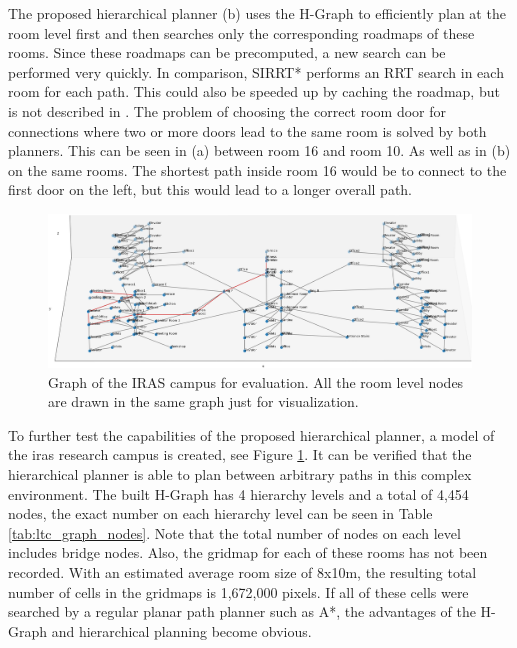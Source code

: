 The proposed hierarchical planner (b) uses the H-Graph to efficiently plan at the room level first and then searches only the corresponding roadmaps of these rooms. Since these roadmaps can be precomputed, a new search can be performed very quickly. In comparison, SIRRT* performs an RRT search in each room for each path. This could also be speeded up by caching the roadmap, but is not described in \cite{ryu_hierarchical_2020}. The problem of choosing the correct room door for connections where two or more doors lead to the same room is solved by both planners. This can be seen in (a) between room 16 and room 10. As well as in (b) on the same rooms. The shortest path inside room 16 would be to connect to the first door on the left, but this would lead to a longer overall path. 

\begin{figure}[h]
    \centering
    \includegraphics[width=\textwidth]{figures/40_concept/ltc_graph_complete.png}
    \caption[Graph of the IRAS campus for evaluation]{Graph of the IRAS campus for evaluation. All the room level nodes are drawn in the same graph just for visualization.}
    \label{fig:ltc_graph_complete}
\end{figure}

To further test the capabilities of the proposed hierarchical planner, a model of the \gls{iras} research campus is created, see Figure \ref{fig:ltc_graph_complete}. It can be verified that the hierarchical planner is able to plan between arbitrary paths in this complex environment. The built H-Graph has 4 hierarchy levels and a total of 4,454 nodes, the exact number on each hierarchy level can be seen in Table \ref{tab:ltc_graph_nodes}. Note that the total number of nodes on each level includes bridge nodes. Also, the gridmap for each of these rooms has not been recorded. With an estimated average room size of 8x10m, the resulting total number of cells in the gridmaps is 1,672,000 pixels. If all of these cells were searched by a regular planar path planner such as A*, the advantages of the H-Graph and hierarchical planning become obvious.

